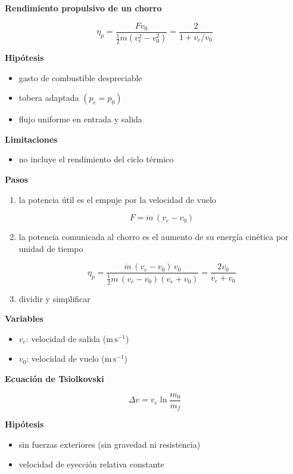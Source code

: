 \documentclass[10pt,openany]{book}
\begin{document}
\begin{tcolorbox}[title={Desarrollos del modelo}, studiumdef, breakable]

\noindent\textbf{Rendimiento propulsivo de un chorro}

\begin{equation}
\eta_p = \frac{F v_0}{\tfrac12\dot m\left(v_e^{2} - v_0^{2}\right)} = \frac{2}{1 + v_e/v_0}
\label{eq:c09-rend-prop}
\end{equation}

\noindent\textbf{Hipótesis}
\begin{itemize}
\item gasto de combustible despreciable
\item tobera adaptada \((p_e = p_0)\)
\item flujo uniforme en entrada y salida
\end{itemize}

\noindent\textbf{Limitaciones}
\begin{itemize}
\item no incluye el rendimiento del ciclo térmico
\end{itemize}

\noindent\textbf{Pasos}
\begin{enumerate}
\item
la potencia útil es el empuje por la velocidad de vuelo

\[
F = \dot m\,(v_e - v_0)
\]
\item
la potencia comunicada al chorro es el aumento de su energía cinética por unidad de tiempo

\[
\eta_p = \frac{\dot m\,(v_e - v_0)\,v_0}{\tfrac12\dot m\,(v_e - v_0)(v_e + v_0)} = \frac{2 v_0}{v_e + v_0}
\]
\item
dividir y simplificar
\end{enumerate}

\noindent\textbf{Variables}
\begin{itemize}
\item $v_{e}$: velocidad de salida ($\mathrm{m}\,\mathrm{s}^{-1}$)
\item $v_{0}$: velocidad de vuelo ($\mathrm{m}\,\mathrm{s}^{-1}$)
\end{itemize}



\noindent\textbf{Ecuación de Tsiolkovski}

\[
\Delta v = v_e\ln\frac{m_0}{m_f}
\]

\noindent\textbf{Hipótesis}
\begin{itemize}
\item sin fuerzas exteriores (sin gravedad ni resistencia)
\item velocidad de eyección relativa constante
\end{itemize}


\end{tcolorbox}
\end{document}
